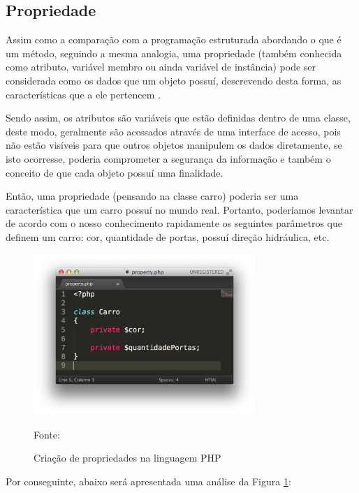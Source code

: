 \subsection{Propriedade}
Assim como a comparação com a programação estruturada abordando o que é um
método, seguindo a mesma analogia, uma propriedade (também conhecida como
atributo, variável membro ou ainda variável de instância) pode ser considerada
como os dados que um objeto possuí, descrevendo desta forma, as características
que a ele pertencem \cite{programmingPhp}.

Sendo assim, os atributos são variáveis que estão definidas dentro de uma
classe, deste modo, geralmente são acessados através de uma interface de acesso,
pois não estão visíveis para que outros objetos manipulem os dados diretamente,
se isto ocorresse, poderia comprometer a segurança da informação e também o
conceito de que cada objeto possuí uma finalidade.

Então, uma propriedade (pensando na classe carro) poderia ser uma característica
que um carro possuí no mundo real. Portanto, poderíamos levantar de acordo com
o nosso conhecimento rapidamente os seguintes parâmetros que definem um carro:
cor, quantidade de portas, possuí direção hidráulica, etc.

\begin{figure}[h!tb]
	\caption{Criação de propriedades na linguagem PHP}
	\label{fig:propriedade}

	\centering
	\includegraphics[width=0.75\textwidth]{images/property.png}

	\centering
	\footnotesize Fonte: \fonteOAutor
\end{figure}

\FloatBarrier 	%

Por conseguinte, abaixo será apresentada uma análise da Figura
\ref{fig:propriedade}:


